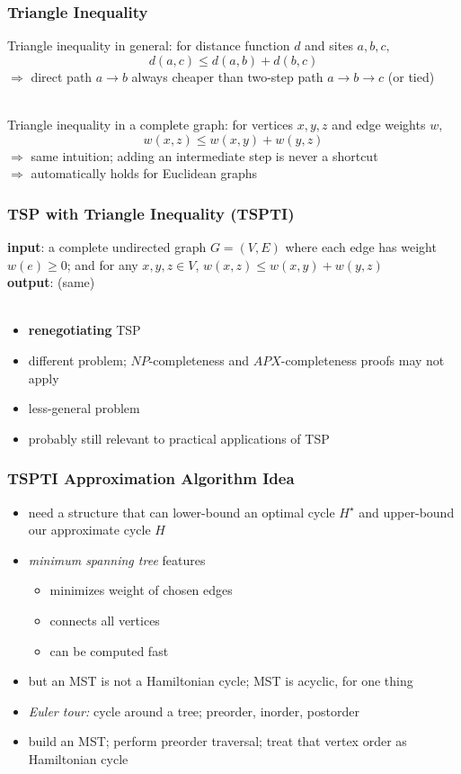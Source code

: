 \documentclass{beamer}
\newcommand{\stanza}{ \\~\ }
\begin{document}
\begin{frame} \frametitle{Triangle Inequality}
Triangle inequality in general: for distance function $d$ and sites $a, b, c,$
\[ d(a, c) \leq d(a, b) + d(b, c) \]
$\Rightarrow$ direct path $a \rightarrow b$ always cheaper than two-step path
$a \rightarrow b \rightarrow c$ (or tied) \stanza

Triangle inequality in a complete graph: for vertices $x, y, z$ and edge weights $w,$
\[ w(x, z) \leq w(x, y) + w(y, z) \]
$\Rightarrow$ same intuition; adding an intermediate step is never a shortcut \\
$\Rightarrow$ automatically holds for Euclidean graphs
\end{frame}

\begin{frame} \frametitle{TSP with Triangle Inequality (TSPTI)}

\textbf{input}: a complete undirected graph $G=(V,E)$ where each edge has weight $w(e) \geq 0$;
and for any $x, y, z \in V$, $w(x, z) \leq w(x, y) + w(y, z)$ \\
\textbf{output}: (same) \stanza
\begin{itemize}
  \item \textbf{renegotiating} TSP
  \item different problem; $NP$-completeness and $APX$-completeness proofs may not apply
  \item less-general problem
  \item probably still relevant to practical applications of TSP
\end{itemize}
\end{frame}

\begin{frame} \frametitle{TSPTI Approximation Algorithm Idea}
\begin{itemize}
  \item need a structure that can lower-bound an optimal cycle $H^\star$ and upper-bound
    our approximate cycle $H$
  \item \emph{minimum spanning tree} features
  \begin{itemize}
    \item minimizes weight of chosen edges
    \item connects all vertices
    \item can be computed fast
  \end{itemize}
  \item but an MST is not a Hamiltonian cycle; MST is acyclic, for one thing
  \item \emph{Euler tour:} cycle around a tree; preorder, inorder, postorder
  \item build an MST; perform preorder traversal; treat that vertex order as Hamiltonian cycle
\end{itemize}
\end{frame}
\end{document}

